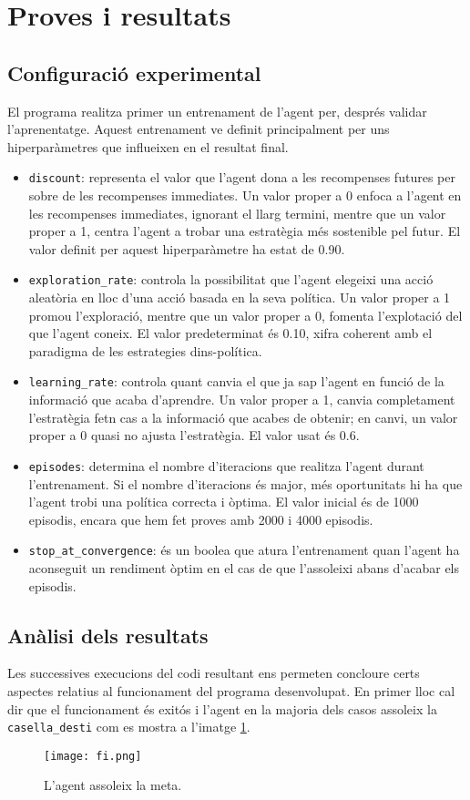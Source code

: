 \documentclass{article}
\begin{document}
\section{Proves i resultats}
\subsection{Configuració experimental}
El programa realitza primer un entrenament de l'agent per, després validar l'aprenentatge. Aquest entrenament ve definit principalment per uns hiperparàmetres que influeixen en el resultat final.
\begin{itemize}
    \item \verb|discount|: representa el valor que l'agent dona a les recompenses futures per sobre de les recompenses immediates. Un valor proper a 0 enfoca a l'agent en les recompenses immediates, ignorant el llarg termini, mentre que un valor proper a 1, centra l'agent a trobar una estratègia més sostenible pel futur. El valor definit per aquest hiperparàmetre ha estat de 0.90.
    \item \verb|exploration_rate|: controla la possibilitat que l'agent elegeixi una acció aleatòria en lloc d'una acció basada en la seva política. Un valor proper a 1 promou l'exploració, mentre que un valor proper a 0, fomenta l'explotació del que l'agent coneix. El valor predeterminat és 0.10, xifra coherent amb el paradigma de les estrategies dins-política.
    \item \verb|learning_rate|: controla quant canvia el que ja sap l'agent en funció de la informació que acaba d'aprendre. Un valor proper a 1, canvia completament l'estratègia fetn cas a la informació que acabes de obtenir; en canvi, un valor proper a 0 quasi no ajusta l'estratègia. El valor usat és 0.6.
    \item \verb|episodes|: determina el nombre d'iteracions que realitza l'agent durant l'entrenament. Si el nombre d'iteracions és major, més oportunitats hi ha que l'agent trobi una política correcta i òptima. El valor inicial és de 1000 episodis, encara que hem fet proves amb 2000 i 4000 episodis.
    \item \verb|stop_at_convergence|: és un boolea que atura l'entrenament quan l'agent ha aconseguit un rendiment òptim en el cas de que l'assoleixi abans d'acabar els episodis. 
\end{itemize}
\subsection{Anàlisi dels resultats}
Les successives execucions del codi resultant ens permeten concloure certs aspectes relatius al funcionament del programa desenvolupat. En primer lloc cal dir que el funcionament és exitós i l'agent en la majoria dels casos assoleix la \verb|casella_desti| com es mostra a l'imatge \ref{fi.png}.\\
\begin{figure}[h!]
    \vspace{-0.7cm}
    \centering
    \texttt{[image: fi.png]}
    \caption{L'agent assoleix la meta.}
    \label{fi.png}
\end{figure}
\end{document}
